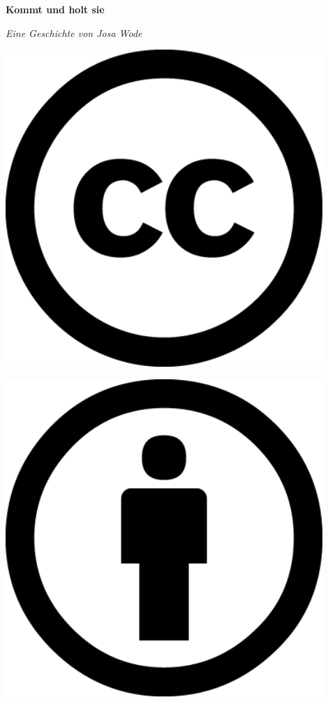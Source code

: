 \documentclass[paper=a5,fontsize=11pt,DIV=10]{scrreprt}
\begin{document}
\thispagestyle{empty}



\noindent
{\Huge \textbf{Kommt und holt sie}}

\noindent
{\textit{Eine Geschichte von Josa Wode}}

\vspace{1.1cm}
\noindent

\clearpage
{}

{\licensefont\small

\noindent
\begin{minipage}[c]{0.15\textwidth}
		\includegraphics[width=0.9\textwidth]{img/cc-large.png}
\end{minipage}
\begin{minipage}[c]{0.15\textwidth}
		\includegraphics[width=0.9\textwidth]{img/by-large.png}

\end{minipage}}
\end{document}
